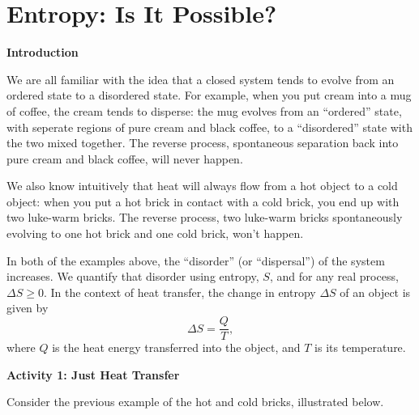 \section{Entropy: Is It Possible?}

\makelabheader %

\vspace{0.2in}
\textbf{Introduction} 

We are all familiar with the idea that a closed system tends to evolve from an ordered state to a disordered state.  For example, when you put cream into a mug of coffee, the cream tends to disperse: the mug evolves from an ``ordered'' state, with seperate regions of pure cream and black coffee, to a ``disordered'' state with the two mixed together.  The reverse process, spontaneous separation back into pure cream and black coffee, will never happen.

We also know intuitively that heat will always flow from a hot object to a cold object: when you put a hot brick in contact with a cold brick, you end up with two luke-warm bricks.  The reverse process, two luke-warm bricks spontaneously evolving to one hot brick and one cold brick, won't happen.  

In both of the examples above, the ``disorder'' (or ``dispersal'') of the system increases.  We quantify that disorder using entropy, $S$, and for any real process, $\Delta S \geq 0$.  In the context of heat transfer, the change in entropy $\Delta S$ of an object is given by 
\begin{displaymath}
\Delta S = \frac{Q}{T},
\end{displaymath}
where $Q$ is the heat energy transferred into the object, and $T$ is its temperature.  

\vspace{0.3 in}
\textbf{Activity 1: Just Heat Transfer}

Consider the previous example of the hot and cold bricks, illustrated below.

